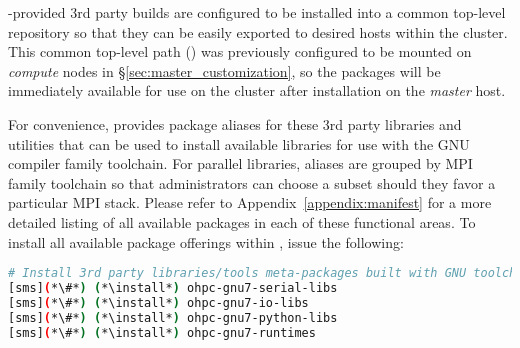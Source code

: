 \begin{center}
\begin{tcolorbox}[]
\small
\OHPC{}-provided 3rd party builds are configured to be installed
into a common top-level repository so that they can be easily exported to
desired hosts within the cluster. This common top-level path
() was previously configured to be mounted on {\em
 compute} nodes in \S\ref{sec:master_customization}, so the packages will be
immediately available for use on the cluster after installation on the {\em
 master} host.
\end{tcolorbox}
\end{center}


For convenience, \OHPC{} provides package aliases for these 3rd party libraries
and utilities that can be used to install available libraries for use with the
GNU compiler family toolchain. For parallel libraries, aliases are grouped by
MPI family toolchain so that administrators can choose a subset should they
favor a particular MPI stack.  Please refer to Appendix~\ref{appendix:manifest}
for a more detailed listing of all available packages in each of these functional
areas. To install all available package offerings within \OHPC{}, issue the
following:

\begin{lstlisting}[language=bash,keywords={},upquote=true,keepspaces]
# Install 3rd party libraries/tools meta-packages built with GNU toolchain
[sms](*\#*) (*\install*) ohpc-gnu7-serial-libs
[sms](*\#*) (*\install*) ohpc-gnu7-io-libs
[sms](*\#*) (*\install*) ohpc-gnu7-python-libs
[sms](*\#*) (*\install*) ohpc-gnu7-runtimes
\end{lstlisting}



